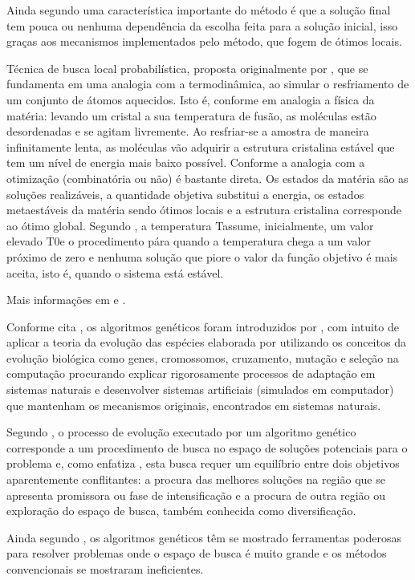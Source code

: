 Ainda segundo \cite{armentanointroduccao} uma característica importante do método é que a solução final tem pouca ou nenhuma dependência da escolha feita para a solução inicial, isso graças aos mecanismos implementados pelo método, que fogem de ótimos locais.


Técnica de busca local probabilística, proposta originalmente por \cite{kirkpatrick1983optimization}, que se fundamenta em uma analogia com a termodinâmica, ao simular o 
resfriamento de um conjunto de átomos aquecidos. Isto é, conforme \cite{noronha2003abordagem} em 
analogia a física da matéria: levando um cristal a sua temperatura de fusão, as moléculas 
estão desordenadas e se agitam livremente. Ao resfriar-se a amostra de maneira 
infinitamente lenta, as moléculas vão adquirir a estrutura cristalina estável que tem um 
nível de energia mais baixo possível. 
Conforme \cite{aarts1988simulated} a analogia com a otimização (combinatória ou não) 
é bastante direta. Os estados da matéria são as soluções realizáveis, a quantidade objetiva 
substitui a energia, os estados metaestáveis da matéria sendo ótimos locais e a estrutura 
cristalina corresponde ao ótimo global. 
Segundo \cite{reeves1993modern}, a temperatura Tassume, inicialmente, um valor 
elevado T0e o procedimento pára quando a temperatura chega a um valor próximo de zero 
e nenhuma solução que piore o valor da função objetivo é mais aceita, isto é, quando o 
sistema está estável.\par
Mais informações em \cite{reeves1993modern} e \cite{kirkpatrick1983optimization}. 


Conforme cita \cite{oliveira2005algoritmo}, os algoritmos genéticos foram introduzidos 
por \cite{holland1975adaptation}, com intuito de aplicar a teoria da evolução das espécies 
elaborada por \cite{darwin1968origin} utilizando os conceitos da evolução biológica como 
genes, cromossomos, cruzamento, mutação e seleção na computação procurando explicar rigorosamente processos de adaptação em sistemas naturais e desenvolver sistemas artificiais (simulados em computador) que mantenham os mecanismos originais, encontrados em sistemas naturais.\par

Segundo \cite{oliveira2005algoritmo}, o processo de evolução executado por um algoritmo genético corresponde a um procedimento de busca no espaço de soluções potenciais para o problema e, como enfatiza \cite{michalewicz1996evolutionary}, esta busca requer um equilíbrio entre dois objetivos aparentemente conflitantes: a procura das melhores soluções na região que se apresenta promissora ou fase de intensificação e a procura de outra região ou exploração do espaço de busca, também conhecida como diversificação.\par
Ainda segundo \cite{oliveira2005algoritmo}, os algoritmos genéticos têm se mostrado ferramentas poderosas para resolver problemas onde o espaço de busca é muito grande e os métodos convencionais se mostraram ineficientes.\par


